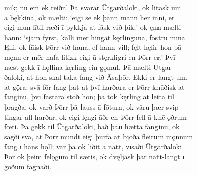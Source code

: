 \documentclass[12pt,letterpaper]{book}
\begin{document}
\begin{linenumbers}
mik; nū em ek reiðr.'  Þā svarar Ūtgarðaloki, ok litask um\\
ā bękkina, ok mælti: `eigi sē ek þann mann hēr inni, er\\
eigi mun lītil-ræði ī þykkja at fāsk við þik;' ok ęnn mælti\\
hann: `sjām fyrst, kalli mēr hingat kęrlinguna, fōstru mīna\\
Ęlli, ok fāisk Þōrr við hana, ef hann vill; fęlt hęfir hon þā\\
męnn er mēr hafa litizk eigi ū-stęrkligri en Þōrr er.'  Þvī\\
næst gekk ī hǫllina kęrling ein gǫmul.  Þā mælti Ūtgar-\\
ðaloki, at hon skal taka fang við Āsaþōr.  Ekki er langt um.\\
at gǫ̈ra: svā fōr fang þat at þvī harðara er Þōrr knūðisk at\\
fanginu, þvī fastara stōð hon; þā tōk kęrling at leita til\\
þragða, ok varð Þōrr þā lauss ā fōtum, ok vāru þær svip-\\
tingar all-harðar, ok eigi lęngi āðr en Þōrr fell ā knē ǫðrum\\
fœti.  Þā gekk til Ūtgarðaloki, bað þau hætta fanginu, ok\\
sagði svā, at Þōrr mundi eigi þurfa at bjōða fleirum mǫnnum\\
fang ī hans hǫll; var þā ok liðit ā nātt, vīsaði Ūtgarðaloki\\
Þōr ok þeim fēlǫgum til sætis, ok dvęljask þar nātt-langt ī\\
gōðum fagnaði.


\end{linenumbers}
\end{document}
